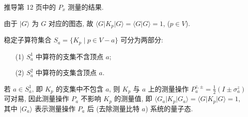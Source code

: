 \documentclass{assignment}
\begin{document}
\begin{prob}
    推导第 12 页中的 $P_x$ 测量的结果.
\end{prob}
\begin{pf}
    由于 $\lvert G\rangle$ 为 $G$ 对应的图态, 故 $\langle G\rvert K_p\lvert G\rangle=\langle G\vert G\rangle=1$, ($p\in V$).

    稳定子算符集合 $S_a=\{K_p\mid p\in V-a\}$ 可分为两部分:
    \begin{itemize}
        \item[(1)] $S_a^1$ 中算符的支集不含顶点 $a$;
        \item[(2)] $S_a^2$ 中算符的支集含顶点 $a$.
    \end{itemize}
    若 $a\in S_a^1$, 即 $K_p$ 的支集中不包含 $a$, 则 $K_p$ 与 $a$ 上的测量操作 $P_a^{z,\pm}=\frac{1}{2}(I\pm\sigma_a^z)$ 可对易, 因此测量操作 $P_a$ 不影响 $K_p$ 的测量值, 即 $\langle G_a\rvert K_p\lvert G_a\rangle=\langle G\rvert K_p\lvert G\rangle=1$, 其中 $\lvert G_a\rangle$ 表示测量操作 $P_a$ 后 (去除测量比特 $a$) 系统的量子态.


\end{pf}
\end{document}
